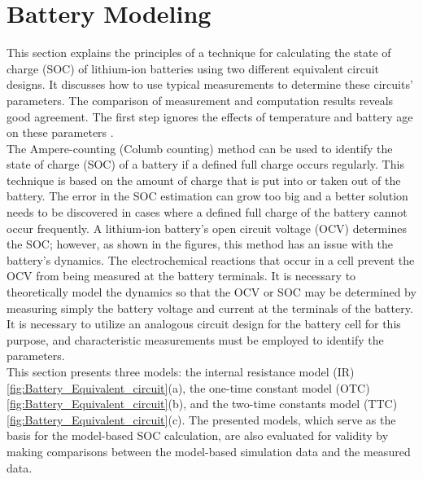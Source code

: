 \section{Battery Modeling}
This section explains the principles of a technique for calculating the state of charge (SOC) of lithium-ion batteries using two different equivalent circuit designs. It discusses how to use typical measurements to determine these circuits' parameters. The comparison of measurement and computation results reveals good agreement. The first step ignores the effects of temperature and battery age on these parameters \cite{UKEMPT_AHMAD2012}.
\\
The Ampere-counting (Columb counting) method can be used to identify the state of charge (SOC) of a battery if a defined full charge occurs regularly. This technique is based on the amount of charge that is put into or taken out of the battery. The error in the SOC estimation can grow too big and a better solution needs to be discovered in cases where a defined full charge of the battery cannot occur frequently.
A lithium-ion battery's open circuit voltage (OCV) determines the SOC; however, as shown in the figures, this method has an issue with the battery's dynamics.
The electrochemical reactions that occur in a cell prevent the OCV from being measured at the battery terminals. It is necessary to theoretically model the dynamics so that the OCV or SOC may be determined by measuring simply the battery voltage and current at the terminals of the battery. It is necessary to utilize an analogous circuit design for the battery cell for this purpose, and characteristic measurements must be employed to identify the parameters.
\\
This section presents three models: the internal resistance model (IR)\ref{fig:Battery_Equivalent_circuit}(a), the one-time constant model (OTC) \ref{fig:Battery_Equivalent_circuit}(b), and the two-time constants model (TTC) \ref{fig:Battery_Equivalent_circuit}(c). The presented models, which serve as the basis for the model-based SOC calculation, are also evaluated for validity by making comparisons between the model-based simulation data and the measured data\cite{UniPadua_Giacomo}.

